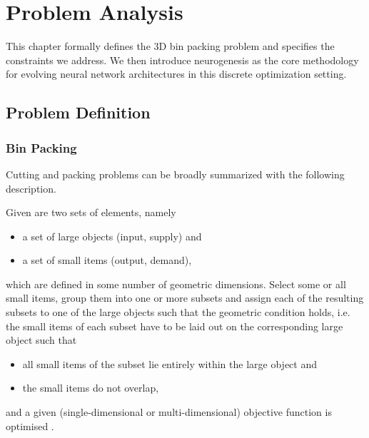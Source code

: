 \chapter{Problem Analysis}

This chapter formally defines the 3D bin packing problem and specifies the constraints we address. We then introduce neurogenesis as the core methodology for evolving neural network architectures in this discrete optimization setting.

\section{Problem Definition}

\subsection{Bin Packing}

Cutting and packing problems can be broadly summarized with the following description.

Given are two sets of elements, namely
\begin{itemize}
    \item a set of large objects (input, supply) and
    \item a set of small items (output, demand),
\end{itemize}
which are defined in some number of geometric dimensions. Select some or all small items, group them into one or more subsets and assign each of the resulting subsets to one of the large objects such that the geometric condition holds, i.e. the small items of each subset have to be laid out on the corresponding large object such that
\begin{itemize}
    \item all small items of the subset lie entirely within the large object and
    \item the small items do not overlap,
\end{itemize}
and a given (single-dimensional or multi-dimensional) objective function is optimised \cite{WHS07}.

